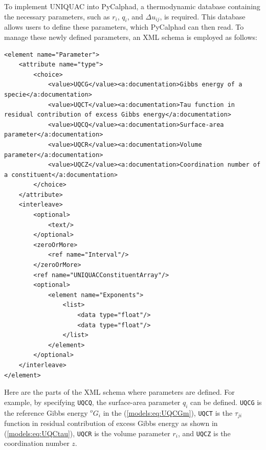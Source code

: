 To implement UNIQUAC into PyCalphad, a thermodynamic database containing the necessary parameters, such as $r_i$, $q_i$, and $\Delta u_{ij}$, is required. This database allows users to define these parameters, which PyCalphad can then read. To manage these newly defined parameters, an XML schema is employed as follows:
\begin{verbatim}
<element name="Parameter">
    <attribute name="type">
        <choice>
            <value>UQCG</value><a:documentation>Gibbs energy of a specie</a:documentation>
            <value>UQCT</value><a:documentation>Tau function in residual contribution of excess Gibbs energy</a:documentation>
            <value>UQCQ</value><a:documentation>Surface-area parameter</a:documentation>
            <value>UQCR</value><a:documentation>Volume parameter</a:documentation>
            <value>UQCZ</value><a:documentation>Coordination number of a constituent</a:documentation>
        </choice>
    </attribute>
    <interleave>
        <optional>
            <text/>
        </optional>
        <zeroOrMore>
            <ref name="Interval"/>
        </zeroOrMore>
        <ref name="UNIQUACConstituentArray"/>
        <optional>
            <element name="Exponents">
                <list>
                    <data type="float"/>
                    <data type="float"/>
                </list>
            </element>
        </optional>
    </interleave>
</element>
\end{verbatim}
Here are the parts of the XML schema where parameters are defined. For example, by specifying \texttt{UQCQ}, the surface-area parameter $q_i$ can be defined. \texttt{UQCG} is the reference Gibbs energy ${^o}G_i$ in the (\ref{models:eq:UQCGm}), \texttt{UQCT} is the $\tau_{ji}$ function in residual contribution of excess Gibbs energy as shown in (\ref{models:eq:UQCtau}), \texttt{UQCR} is the volume parameter $r_i$, and \texttt{UQCZ} is the coordination number $z$.

